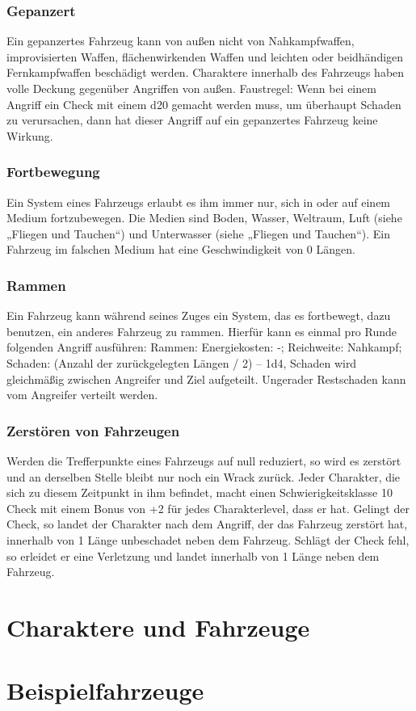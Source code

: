 \subsubsection{Gepanzert}
Ein gepanzertes Fahrzeug kann von außen nicht von Nahkampfwaffen, improvisierten Waffen, flächenwirkenden Waffen und leichten oder beidhändigen Fernkampfwaffen beschädigt werden. Charaktere innerhalb des Fahrzeugs haben volle Deckung gegenüber Angriffen von außen.
Faustregel: Wenn bei einem Angriff ein Check mit einem d20 gemacht werden muss, um überhaupt Schaden zu verursachen, dann hat dieser Angriff auf ein gepanzertes Fahrzeug keine Wirkung.
\subsubsection{Fortbewegung}
Ein System eines Fahrzeugs erlaubt es ihm immer nur, sich in oder auf einem Medium fortzubewegen. Die Medien sind Boden, Wasser, Weltraum, Luft (siehe „Fliegen und Tauchen“) und Unterwasser (siehe „Fliegen und Tauchen“).
Ein Fahrzeug im falschen Medium hat eine Geschwindigkeit von 0 Längen.
\subsubsection{Rammen}
Ein Fahrzeug kann während seines Zuges ein System, das es fortbewegt, dazu benutzen, ein anderes Fahrzeug zu rammen. Hierfür kann es einmal pro Runde folgenden Angriff ausführen:
Rammen: Energiekosten: -; Reichweite: Nahkampf;
Schaden: (Anzahl der zurückgelegten Längen / 2) – 1d4, Schaden wird gleichmäßig zwischen Angreifer und Ziel aufgeteilt. Ungerader Restschaden kann vom Angreifer verteilt werden.
\subsubsection{Zerstören von Fahrzeugen}
Werden die Trefferpunkte eines Fahrzeugs auf null reduziert, so wird es zerstört und an derselben Stelle bleibt nur noch ein Wrack zurück. Jeder Charakter, die sich zu diesem Zeitpunkt in ihm befindet, macht einen Schwierigkeitsklasse 10 Check mit einem Bonus von +2 für jedes Charakterlevel, dass er hat. Gelingt der Check, so landet der Charakter nach dem Angriff, der das Fahrzeug zerstört hat, innerhalb von 1 Länge unbeschadet neben dem Fahrzeug. Schlägt der Check fehl, so erleidet er eine Verletzung und landet innerhalb von 1 Länge neben dem Fahrzeug.
\section{Charaktere und Fahrzeuge}
\section{Beispielfahrzeuge}
